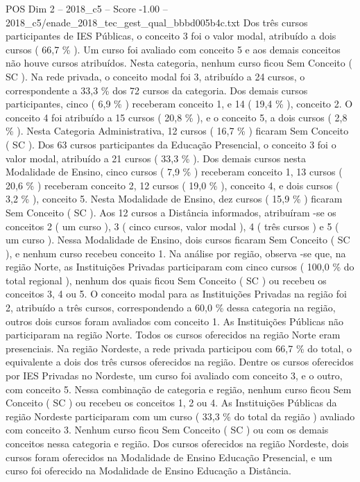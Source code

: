 \begin{textsample}{POS Dim 2 – 2018\_c5 – Score -1.00 – 2018\_c5/enade\_2018\_tec\_gest\_qual\_bbbd005b4c.txt}
Dos três cursos participantes de IES Públicas, o conceito 3 foi o valor modal, atribuído a dois cursos ( 66,7 \% ).
Um curso foi avaliado com conceito 5 e aos demais conceitos não houve cursos atribuídos.
Nesta categoria, nenhum curso ficou Sem Conceito ( SC ).
Na rede privada, o conceito modal foi 3, atribuído a 24 cursos, o correspondente a 33,3 \% dos 72 cursos da categoria.
Dos demais cursos participantes, cinco ( 6,9 \% ) receberam conceito 1, e 14 ( 19,4 \% ), conceito 2.
O conceito 4 foi atribuído a 15 cursos ( 20,8 \% ), e o conceito 5, a dois cursos ( 2,8 \% ).
Nesta Categoria Administrativa, 12 cursos ( 16,7 \% ) ficaram Sem Conceito ( SC ).
Dos 63 cursos participantes da Educação Presencial, o conceito 3 foi o valor modal, atribuído a 21 cursos ( 33,3 \% ).
Dos demais cursos nesta Modalidade de Ensino, cinco cursos ( 7,9 \% ) receberam conceito 1, 13 cursos ( 20,6 \% ) receberam conceito 2, 12 cursos ( 19,0 \% ), conceito 4, e dois cursos ( 3,2 \% ), conceito 5.
Nesta Modalidade de Ensino, dez cursos ( 15,9 \% ) ficaram Sem Conceito ( SC ).
Aos 12 cursos a Distância informados, atribuíram -se os conceitos 2 ( um curso ), 3 ( cinco cursos, valor modal ), 4 ( três cursos ) e 5 ( um curso ).
Nessa Modalidade de Ensino, dois cursos ficaram Sem Conceito ( SC ), e nenhum curso recebeu conceito 1.
Na análise por região, observa -se que, na região Norte, as Instituições Privadas participaram com cinco cursos ( 100,0 \% do total regional ), nenhum dos quais ficou Sem Conceito ( SC ) ou recebeu os conceitos 3, 4 ou 5.
O conceito modal para as Instituições Privadas na região foi 2, atribuído a três cursos, correspondendo a 60,0 \% dessa categoria na região, outros dois cursos foram avaliados com conceito 1.
As Instituições Públicas não participaram na região Norte.
Todos os cursos oferecidos na região Norte eram presenciais.
Na região Nordeste, a rede privada participou com 66,7 \% do total, o equivalente a dois dos três cursos oferecidos na região.
Dentre os cursos oferecidos por IES Privadas no Nordeste, um curso foi avaliado com conceito 3, e o outro, com conceito 5.
Nessa combinação de categoria e região, nenhum curso ficou Sem Conceito ( SC ) ou recebeu os conceitos 1, 2 ou 4.
As Instituições Públicas da região Nordeste participaram com um curso ( 33,3 \% do total da região ) avaliado com conceito 3.
Nenhum curso ficou Sem Conceito ( SC ) ou com os demais conceitos nessa categoria e região.
Dos cursos oferecidos na região Nordeste, dois cursos foram oferecidos na Modalidade de Ensino Educação Presencial, e um curso foi oferecido na Modalidade de Ensino Educação a Distância.

\end{textsample}

